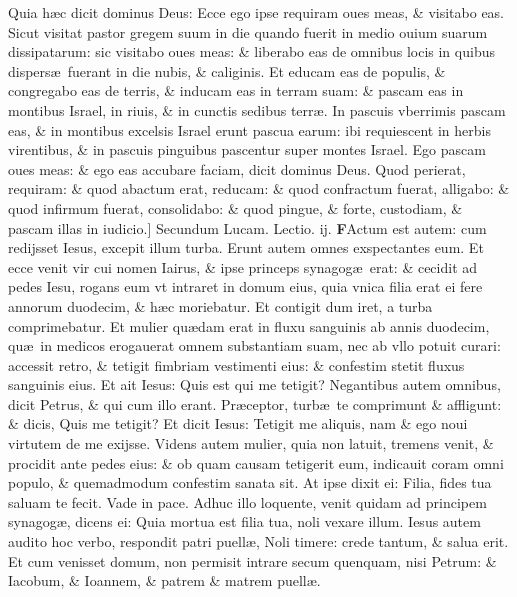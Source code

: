 \documentclass[a5paper,10pt]{book}
\def\leftmarginnote{%
	\lrmarginnote{\hskip -\marginparsep \hskip -6.5em}}
\def\ae{æ}
\begin{document}
\begin{multicols*}{2}
Quia h\ae c dicit dominus Deus: Ecce ego ipse requiram oues meas, \& visitabo eas.
Sicut visitat pastor gregem suum in die quando fuerit in medio ouium suarum dissipatarum: sic visitabo oues meas: \& liberabo eas de omnibus locis in quibus dispers\ae \ fuerant in die nubis, \& caliginis.
Et educam eas de populis, \& congregabo eas de terris, \& inducam eas in terram suam: \& pascam eas in montibus Israel, in riuis, \& in cunctis sedibus terr\ae .
In pascuis vberrimis pascam eas, \& in montibus excelsis Israel erunt pascua earum: ibi requiescent in herbis virentibus, \& in pascuis pinguibus pascentur super montes Israel.
Ego pascam oues meas: \& ego eas accubare faciam, dicit dominus Deus.
Quod perierat, requiram: \& quod abactum erat, reducam: \& quod confractum fuerat, alligabo: \& quod infirmum fuerat, consolidabo: \& quod pingue, \& forte, custodiam, \& pascam illas in iudicio.]
\newline \color{red} Secundum Lucam. \hfill Lectio. ij. \color{black}
\vspace{-.25em}
\lettrine[lines=2]{\bfseries \color{red} F}{}Actum\leftmarginnote{\begin{flushright}ca. 8.\end{flushright}} est autem: cum redijsset Iesus, excepit illum turba.
Erunt autem omnes exspectantes eum.
Et ecce venit vir cui nomen Iairus, \& ipse princeps synagog\ae \ erat: \& cecidit ad pedes Iesu, rogans eum vt intraret in domum eius, quia vnica filia erat ei fere annorum duodecim, \& h\ae c moriebatur.
Et contigit dum iret, a turba comprimebatur. Et mulier qu\ae dam erat in fluxu sanguinis ab annis duodecim, qu\ae \ in medicos erogauerat omnem substantiam suam, nec ab vllo potuit curari: accessit retro, \& tetigit fimbriam vestimenti eius: \& confestim stetit fluxus sanguinis eius.
Et ait Iesus: Quis est qui me tetigit? Negantibus autem omnibus, dicit Petrus, \& qui cum illo erant. Pr\ae ceptor, turb\ae \ te comprimunt \& affligunt: \& dicis, Quis me tetigit?
Et dicit Iesus: Tetigit me aliquis, nam \& ego noui virtutem de me exijsse.
Videns autem mulier, quia non latuit, tremens venit, \& procidit ante pedes eius: \& ob quam causam tetigerit eum, indicauit coram omni populo, \& quemadmodum confestim sanata sit.
At ipse dixit ei: Filia, fides tua saluam te fecit. Vade in pace.
Adhuc illo loquente, venit quidam ad principem synagog\ae , dicens ei: Quia mortua est filia tua, noli vexare illum.
Iesus autem audito hoc verbo, respondit patri puell\ae , Noli timere: crede tantum, \& salua erit.
Et cum venisset domum, non permisit intrare secum quenquam, nisi Petrum: \& Iacobum, \& Ioannem, \& patrem \& matrem puell\ae .

\end{multicols*}
\end{document}
